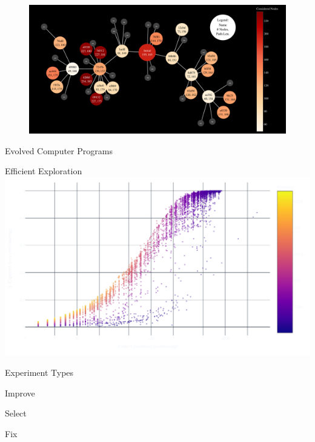 \documentclass[aspectratio=169]{beamer}
\makeatletter
\renewcommand{\emph}[1]{{\Huge \color{pureminimalistic@text@red} #1}}
\newcommand{\white}[1]{{\color{pureminimalistic@text@white} #1}}
\makeatother
\begin{document}
\begin{frame}[plain]
  \begin{figure}
  \centering
  \includegraphics[width=1.0\linewidth,keepaspectratio]{figures/tree.pdf}
  \end{figure}
  \begin{center}
  \emph{Evolved Computer Programs}
  \end{center}
\end{frame}

\begin{frame}{Efficient Exploration}
    \centering
    \includegraphics[width=0.85\linewidth, keepaspectratio]{figures/efficient_overview.pdf}
\end{frame}

\begin{frame}{\white{Experiment Types}}
    \begin{vfilleditems}
    \item \emph{Improve}
    \item \emph{Select}
    \item \emph{Fix}
    \end{vfilleditems}
\end{frame}
\end{document}
